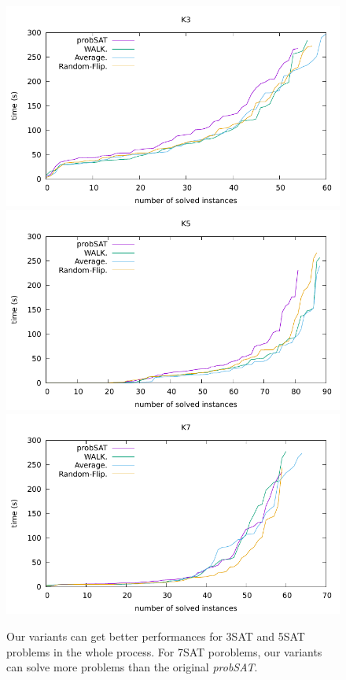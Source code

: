 \documentclass[12pt,a4paper,twoside]{scrartcl}
\numberwithin{equation}{section}
\begin{document}
  \begin{figure}[H]
\begin{center}
  \includegraphics[scale = 0.8]{DATA/K3/e4.pdf}
    \includegraphics[scale = 0.8]{DATA/K5/e4.pdf}
  \includegraphics[scale = 0.8]{DATA/K7/e4.pdf}
  \end{center}
  \label{Experiment 9 k3 cactus plot}
  \end{figure}
  \begin{figure}[H]
\begin{center}

  \end{center}
  \caption{Our variants can get better performances for 3SAT and 5SAT problems in the whole process. For 7SAT poroblems, our variants can solve more problems than the original \emph{probSAT}. }
  \label{Experiment 9 k5 cactus plot}
  \end{figure}
  \clearpage
\end{document}
